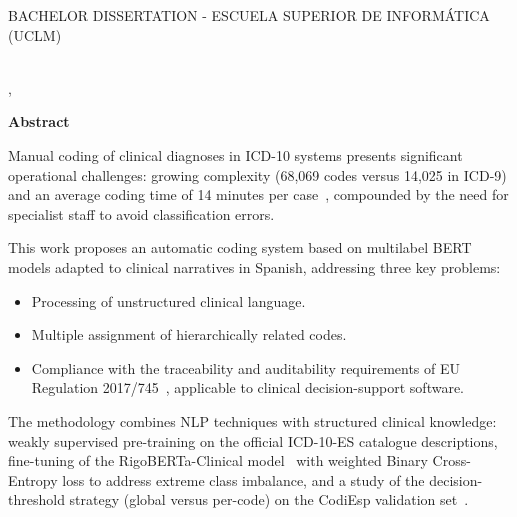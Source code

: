 \makeatletter
\begin{center} %
 {\textsc{BACHELOR DISSERTATION - ESCUELA SUPERIOR DE INFORMÁTICA 
 (UCLM)}\par}
 \vspace{1cm} %
 {\textbf{\Large\@tituloCorto}\par}
 \vspace{0.4cm} %
 {\@autor \\ \@cityTF,{} \@monthTF{} \@yearTF\par} 
 \vspace{0.9cm} %
 {\textbf{\large\textsf{Abstract}}\par} 
\end{center} 
\makeatother %
Manual coding of clinical diagnoses in ICD-10 systems presents significant operational challenges: growing complexity (68,069 codes versus 14,025 in ICD-9) and an average coding time of 14 minutes per case~\cite{sanidad2016cie10,gogorcena2017cie10es}, compounded by the need for specialist staff to avoid classification errors.

This work proposes an automatic coding system based on multilabel BERT models adapted to clinical narratives in Spanish, addressing three key problems:

\begin{itemize}
 \item Processing of unstructured clinical language.
 \item Multiple assignment of hierarchically related codes.
 \item Compliance with the traceability and auditability requirements of EU Regulation 2017/745~\cite{eu2017745}, applicable to clinical decision-support software.
\end{itemize}

The methodology combines NLP techniques with structured clinical knowledge: weakly supervised pre-training on the official ICD-10-ES catalogue descriptions, fine-tuning of the RigoBERTa-Clinical model~\cite{garciasubies2026rigobertaclinical} with weighted Binary Cross-Entropy loss to address extreme class imbalance, and a study of the decision-threshold strategy (global versus per-code) on the CodiEsp validation set~\cite{miranda2020}.

